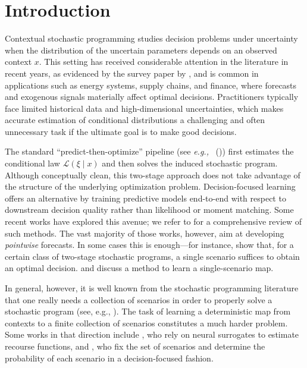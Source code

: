 \documentclass{article}
\begin{document}
\section{Introduction}
Contextual stochastic programming studies decision problems under uncertainty
when the distribution of the uncertain parameters depends on an observed
context $x$.
This setting has received considerable attention in the literature in recent years, as evidenced
by the survey paper by \cite{sadana2024survey}, 
and is common in applications such as energy systems, supply chains, and
finance, where forecasts and exogenous signals materially affect optimal
decisions.
Practitioners typically face limited historical data and high-dimensional
uncertainties, which makes accurate estimation of conditional distributions a challenging
and often unnecessary task if the ultimate goal is to make good decisions.

The standard ``predict-then-optimize'' pipeline (see \emph{e.g.,}~
(\cite{bertsimas2020predictive,  dengPredictiveStochasticProgramming2022, kannanTechnicalNoteDataDriven2025, tianSolvingContextualStochastic2024}))
first estimates the conditional law $\mathcal{L}(\xi\!
    \mid\!x)$ and then solves the induced stochastic program.
Although conceptually clean, this two-stage approach does not take advantage of the 
structure of the underlying optimization problem. 
Decision-focused learning offers an alternative by training predictive models
end-to-end with respect to downstream decision quality rather than likelihood
or moment matching.
Some recent works have explored this avenue; we refer to \cite{mandi2024decision} for a comprehensive review
of such methods. The vast majority of those works, however, aim at developing \textit{pointwise} forecasts. In some cases this is enough---for instance, \cite{homem-de-melloForecastingOutsideBox2024} show that,  for a certain class of  two-stage stochastic  programs,  a single
scenario suffices to obtain an optimal decision. and discuss a method to  learn a
single-scenario map. 

In general, however, it is well known from the stochastic programming literature that one really needs a collection of scenarios in order to properly solve a stochastic program (see, e.g., \cite{wallaceDecisionMakingUncertainty2000}). The task of  learning a deterministic map
from contexts to a finite collection of scenarios constitutes a much harder problem. Some works in that direction include
\cite{islipContextualScenarioGeneration2025}, who rely on neural surrogates
to estimate recourse functions, and \cite{Grigas-ICEO:2021},  who fix
the set of scenarios and determine the probability of each scenario in a decision-focused fashion.
\end{document}
